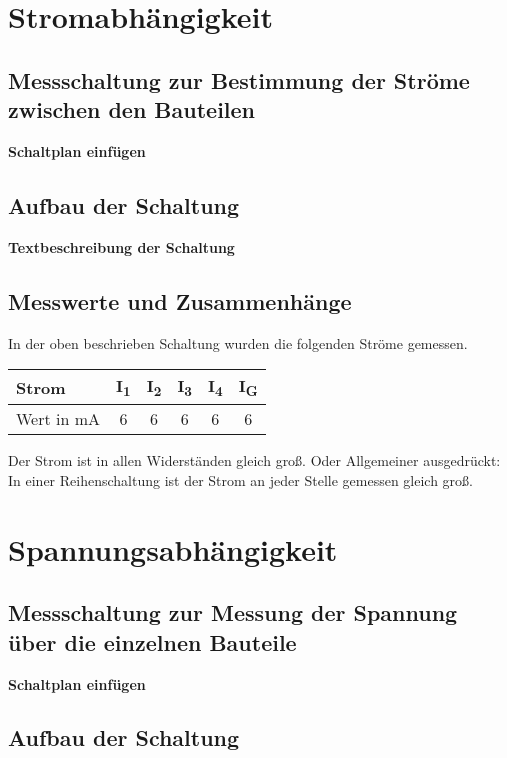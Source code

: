 \documentclass[
a4paper,     %
12pt         %
]{scrartcl}  %
\begin{document}
\section{Stromabhängigkeit}
\subsection{Messschaltung zur Bestimmung der Ströme zwischen den Bauteilen}

\textbf{Schaltplan einfügen}

\subsection{Aufbau der Schaltung}

\textbf{Textbeschreibung der Schaltung}

\subsection{Messwerte und Zusammenhänge}

In der oben beschrieben Schaltung wurden die folgenden Ströme gemessen.
\begin{center}
  \begin{tabular}{ l | c | c | c | c | c}
    \hline
    Strom      & I\textsubscript{1} & I\textsubscript{2} & I\textsubscript{3} & I\textsubscript{4} & I\textsubscript{G} \\ \hline
    Wert in mA & 6 & 6 & 6 & 6 & 6 \\
    \hline
  \end{tabular}
\end{center}
Der Strom ist in allen Widerständen gleich groß. Oder Allgemeiner ausgedrückt: In einer Reihenschaltung ist der Strom an jeder Stelle gemessen gleich groß.

\section{Spannungsabhängigkeit}
\subsection{Messschaltung zur Messung der Spannung über die einzelnen Bauteile}

\textbf{Schaltplan einfügen}

\subsection{Aufbau der Schaltung}
\end{document}
